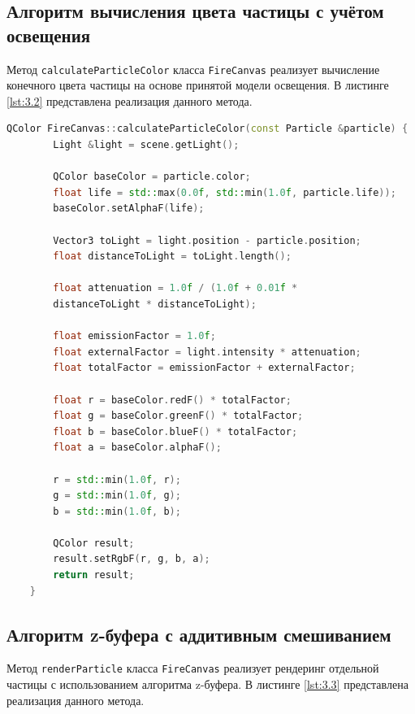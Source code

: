 \clearpage

\subsection{Алгоритм вычисления цвета частицы с учётом освещения}

Метод \texttt{calculateParticleColor} класса \texttt{FireCanvas} реализует вычисление конечного цвета частицы на основе принятой модели освещения. В листинге \ref{lst:3.2} представлена реализация данного метода.

\begin{lstlisting}[language=C++, caption={Вычисление цвета частицы с учётом освещения}, label={lst:3.2},captionpos=b]
	QColor FireCanvas::calculateParticleColor(const Particle &particle) {
		Light &light = scene.getLight();
		
		QColor baseColor = particle.color;
		float life = std::max(0.0f, std::min(1.0f, particle.life));
		baseColor.setAlphaF(life);
		
		Vector3 toLight = light.position - particle.position;
		float distanceToLight = toLight.length();
		
		float attenuation = 1.0f / (1.0f + 0.01f * 
		distanceToLight * distanceToLight);
		
		float emissionFactor = 1.0f;
		float externalFactor = light.intensity * attenuation;
		float totalFactor = emissionFactor + externalFactor;
		
		float r = baseColor.redF() * totalFactor;
		float g = baseColor.greenF() * totalFactor;
		float b = baseColor.blueF() * totalFactor;
		float a = baseColor.alphaF();
		
		r = std::min(1.0f, r);
		g = std::min(1.0f, g);
		b = std::min(1.0f, b);
		
		QColor result;
		result.setRgbF(r, g, b, a);
		return result;
	}
\end{lstlisting}

\clearpage

\subsection{Алгоритм z-буфера с аддитивным смешиванием}

Метод \texttt{renderParticle} класса \texttt{FireCanvas} реализует рендеринг отдельной частицы с использованием алгоритма z-буфера. В листинге \ref{lst:3.3} представлена реализация данного метода.

